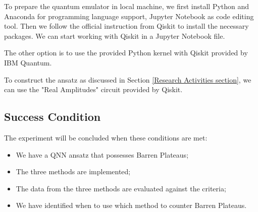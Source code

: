 To prepare the quantum emulator in local machine, we first install Python and Anaconda for programming language support, Jupyter Notebook as code editing tool.
Then we follow the official instruction from Qiskit \cite{Qiskit} to install the necessary packages.
We can start working with Qiskit in a Jupyter Notebook file.

The other option is to use the provided Python kernel with Qiskit provided by IBM Quantum.

To construct the ansatz as discussed in Section \ref{Research Activities section}, we can use the "Real Amplitudes" circuit provided by Qiskit.


\subsection{Success Condition}
The experiment will be concluded when these conditions are met:
\begin{itemize}
    \item We have a QNN ansatz that possesses Barren Plateaus;
    \item The three methods are implemented;
    \item The data from the three methods are evaluated against the criteria;
    \item We have identified when to use which method to counter Barren Plateaus.
\end{itemize}